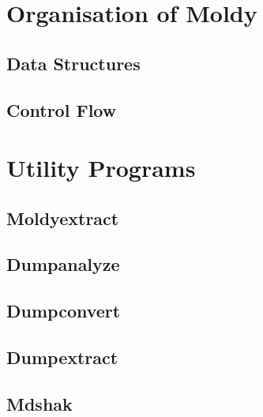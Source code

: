 \chapter{Organisation of Moldy}
\section{Data Structures}
\label{sec:structs}
\section{Control Flow}

\chapter{Utility Programs}
\section{Moldyextract}
\section{Dumpanalyze}
\section{Dumpconvert}
\label{sec:dumpconvert}
\section{Dumpextract}
\section{Mdshak}

